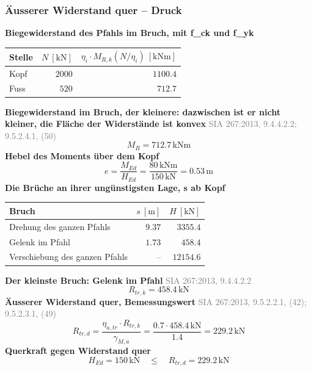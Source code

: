 \documentclass[11pt,a4paper]{article}
\newcommand{\normref}[1]{{\small\textcolor{gray}{#1}}}
\begin{document}
\subsubsection{Äusserer Widerstand quer – Druck}
\noindent\textbf{Biegewiderstand des Pfahls im Bruch, mit f\_ck und f\_yk}
\begin{longtable}{lrr}
\hline
Stelle & $N\ [\mathrm{kN}]$ & $\eta_i \cdot M_{R,k}(N / \eta_i)\ [\mathrm{kNm}]$ \\
\hline
\endhead
Kopf & $2000$ & $1100.4$ \\
Fuss & $520$ & $712.7$ \\
\hline
\end{longtable}
\noindent\textbf{Biegewiderstand im Bruch, der kleinere: dazwischen ist er nicht kleiner, die Fläche der Widerstände ist konvex} \hfill \normref{SIA 267:2013, 9.4.4.2.2; 9.5.2.4.1, (50)}
\begin{equation*}
M_R = 712.7\,\mathrm{kNm}
\end{equation*}
\noindent\textbf{Hebel des Moments über dem Kopf}
\begin{equation*}
e = \frac{M_{Ed}}{H_{Ed}} = \frac{80\,\mathrm{kNm}}{150\,\mathrm{kN}} = 0.53\,\mathrm{m}
\end{equation*}
\noindent\textbf{Die Brüche an ihrer ungünstigsten Lage, s ab Kopf}
\begin{longtable}{lrr}
\hline
Bruch & $s\ [\mathrm{m}]$ & $H\ [\mathrm{kN}]$ \\
\hline
\endhead
Drehung des ganzen Pfahls & $9.37$ & $3355.4$ \\
Gelenk im Pfahl & $1.73$ & $458.4$ \\
Verschiebung des ganzen Pfahls & – & $12154.6$ \\
\hline
\end{longtable}
\noindent\textbf{Der kleinste Bruch: Gelenk im Pfahl} \hfill \normref{SIA 267:2013, 9.4.4.2.2}
\begin{equation*}
R_{tr,k} = 458.4\,\mathrm{kN}
\end{equation*}
\noindent\textbf{Äusserer Widerstand quer, Bemessungswert} \hfill \normref{SIA 267:2013, 9.5.2.2.1, (42); 9.5.2.3.1, (49)}
\begin{equation*}
R_{tr,d} = \frac{\eta_{a,tr} \cdot R_{tr,k}}{\gamma_{M,a}} = \frac{0.7 \cdot 458.4\,\mathrm{kN}}{1.4} = 229.2\,\mathrm{kN}
\end{equation*}
\noindent\textbf{Querkraft gegen Widerstand quer}
\begin{equation*}
H_{Ed} = 150\,\mathrm{kN} \quad \le \quad R_{tr,d} = 229.2\,\mathrm{kN}
\end{equation*}
\end{document}
